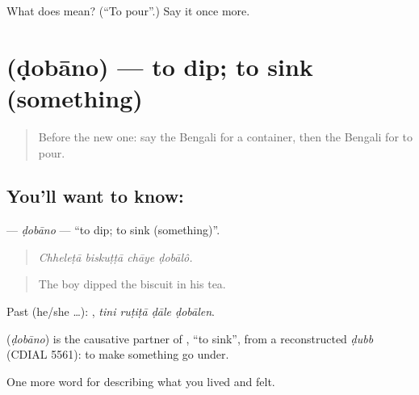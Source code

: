 \begin{tcolorbox}[breakable,colback=teal!4,colframe=teal!35!black,title={Before you move on}]
What does  mean? (\textquotedblleft{}To pour\textquotedblright{}.) Say it once more.
\end{tcolorbox}
\section[\texorpdfstring{\bn{ডোবানো} (ḍobāno)}{ডোবানো (ḍobāno)}]{ (ḍobāno) — to dip; to sink (something)}

\label{lesson:BN-C511-dobano}



\begin{quote}
Before the new one: say the Bengali for a container, then the Bengali for to pour.
\end{quote}

\subsection*{You'll want to know: }
\textbf{} — \emph{ḍobāno} — \textquotedblleft{}to dip; to sink (something)\textquotedblright{}.

\begin{quote}
   
\end{quote}

\begin{quote}
\emph{Chheleṭā biskuṭṭā chāye ḍobālô.}
\end{quote}

\begin{quote}
The boy dipped the biscuit in his tea.
\end{quote}

Past (he/she …):    , \emph{tini ruṭiṭā ḍāle ḍobālen}.

\begin{cousinweb}
\textbf{} (\emph{ḍobāno}) is the causative partner of , \textquotedblleft{}to sink\textquotedblright{}, from a reconstructed \emph{ḍubb} (CDIAL 5561): to make something go under.
\end{cousinweb}

\begin{grammarlens}[title={What you've built}]
One more word for describing what you lived and felt.
\end{grammarlens}


